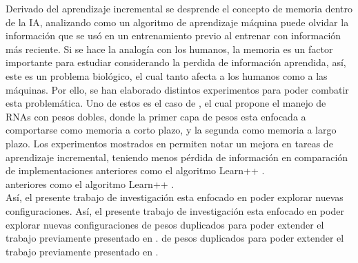   Derivado del aprendizaje incremental se desprende el concepto de memoria dentro de la IA, analizando como un algoritmo de aprendizaje máquina puede olvidar la información que se usó en un entrenamiento previo al entrenar con información más reciente. Si se hace la analogía con los humanos, la memoria es un factor importante para estudiar considerando la perdida de información aprendida, así, este es un problema biológico, el cual tanto afecta a los humanos como a las máquinas. Por ello, se han elaborado distintos experimentos para poder combatir esta problemática. Uno de estos es el caso de \cite{bullinaria2009}, el cual propone el manejo de RNAs con pesos dobles, donde la primer capa de pesos esta enfocada a comportarse como memoria a corto plazo, y la segunda como memoria a largo plazo.  Los experimentos mostrados en \cite{bullinaria2009} permiten notar un mejora en tareas de aprendizaje incremental, teniendo menos pérdida de información en comparación de implementaciones anteriores como el algoritmo  Learn++ \cite{li2008, Elwell2011}.\\ anteriores como el algoritmo  Learn++ \cite{li2008, Elwell2011}.\\
    
  Así, el presente trabajo de investigación esta enfocado en poder explorar nuevas configuraciones. Así, el presente trabajo de investigación esta enfocado en poder explorar nuevas configuraciones de pesos duplicados para poder extender el trabajo previamente presentado en \cite{bullinaria2009}.   de pesos duplicados para poder extender el trabajo previamente presentado en \cite{bullinaria2009}.
